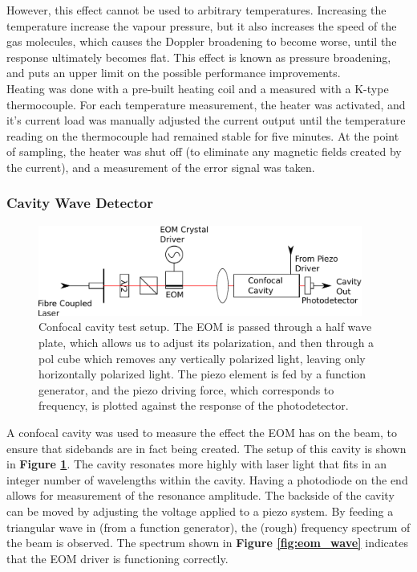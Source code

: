 However, this effect cannot be used to arbitrary temperatures.  Increasing the temperature increase the vapour pressure, but it also increases the speed of the gas molecules, which causes the Doppler broadening to become worse, until the response ultimately becomes flat.  This effect is known as pressure broadening, and puts an upper limit on the possible performance improvements. \\

Heating was done with a pre-built heating coil and a measured with a K-type thermocouple.  For each temperature measurement, the heater was activated, and it's current load was manually adjusted the current output until the temperature reading on the thermocouple had remained stable for five minutes.  At the point of sampling, the heater was shut off (to eliminate any magnetic fields created by the current), and a measurement of the error signal was taken.

    \subsubsection{Cavity Wave Detector}

\begin{figure}
  \centering
  \includegraphics[width=0.95\textwidth]{figures/cavity.pdf}
  \caption[Confocal cavity test setup]{Confocal cavity test setup.  The EOM is passed through a half wave plate, which allows us to adjust its polarization, and then through a pol cube which removes any vertically polarized light, leaving only horizontally polarized light.  The piezo element is fed by a function generator, and the piezo driving force, which corresponds to frequency, is plotted against the response of the photodetector.}
  \label{cavity}
\end{figure}

A confocal cavity was used to measure the effect the EOM has on the beam, to ensure that sidebands are in fact being created.  The setup of this cavity is shown in \textbf{Figure \ref{cavity}}. The cavity resonates more highly with laser light that fits in an integer number of wavelengths within the cavity.  Having a photodiode on the end allows for measurement of the resonance amplitude.  The backside of the cavity can be moved by adjusting the voltage applied to a piezo system.  By feeding a triangular wave in (from a function generator), the (rough) frequency spectrum of the beam is observed. The spectrum shown in \textbf{Figure \ref{fig:eom_wave}} indicates that the EOM driver is functioning correctly.


